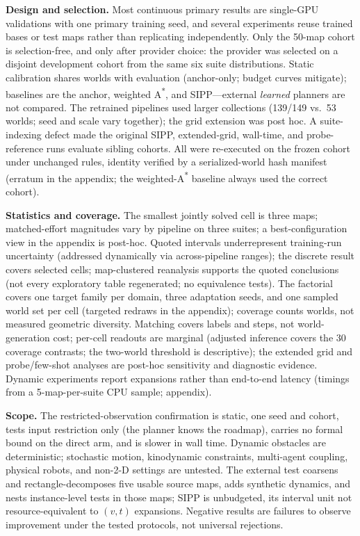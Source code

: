 \documentclass[letterpaper]{article} %
\begin{document}
\textbf{Design and selection.} Most continuous primary results are single-GPU validations with one primary training seed, and several experiments reuse trained bases or test maps rather than replicating independently. Only the 50-map cohort is selection-free, and only after provider choice: the provider was selected on a disjoint development cohort from the same six suite distributions. Static calibration shares worlds with evaluation (anchor-only; budget curves mitigate); baselines are the anchor, weighted A\textsuperscript{*}, and SIPP---external \emph{learned} planners are not compared. The retrained pipelines used larger collections (139/149 vs.\ 53 worlds; seed and scale vary together); the grid extension was post hoc. A suite-indexing defect made the original SIPP, extended-grid, wall-time, and probe-reference runs evaluate sibling cohorts. All were re-executed on the frozen cohort under unchanged rules, identity verified by a serialized-world hash manifest (erratum in the appendix; the weighted-A\textsuperscript{*} baseline always used the correct cohort).

\textbf{Statistics and coverage.} The smallest jointly solved cell is three maps; matched-effort magnitudes vary by pipeline on three suites; a best-configuration view in the appendix is post-hoc. Quoted intervals underrepresent training-run uncertainty (addressed dynamically via across-pipeline ranges); the discrete result covers selected cells; map-clustered reanalysis supports the quoted conclusions (not every exploratory table regenerated; no equivalence tests). The factorial covers one target family per domain, three adaptation seeds, and one sampled world set per cell (targeted redraws in the appendix); coverage counts worlds, not measured geometric diversity. Matching covers labels and steps, not world-generation cost; per-cell readouts are marginal (adjusted inference covers the 30 coverage contrasts; the two-world threshold is descriptive); the extended grid and probe/few-shot analyses are post-hoc sensitivity and diagnostic evidence. Dynamic experiments report expansions rather than end-to-end latency (timings from a 5-map-per-suite CPU sample; appendix).

\textbf{Scope.} The restricted-observation confirmation is static, one seed and cohort, tests input restriction only (the planner knows the roadmap), carries no formal bound on the direct arm, and is slower in wall time. Dynamic obstacles are deterministic; stochastic motion, kinodynamic constraints, multi-agent coupling, physical robots, and non-2-D settings are untested. The external test coarsens and rectangle-decomposes five usable source maps, adds synthetic dynamics, and nests instance-level tests in those maps; SIPP is unbudgeted, its interval unit not resource-equivalent to $(v,t)$ expansions. Negative results are failures to observe improvement under the tested protocols, not universal rejections.
\end{document}
